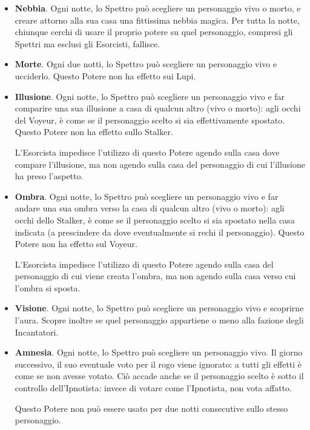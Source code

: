 \documentclass[a4paper,10pt]{article}
\begin{document}
\begin{itemize}
 \item {\bf Nebbia}. Ogni notte, lo Spettro può scegliere un personaggio vivo o morto, e creare attorno alla sua casa una fittissima nebbia magica. Per tutta la notte, chiunque cerchi di usare il proprio potere su quel personaggio, compresi gli Spettri ma esclusi gli Esorcisti, fallisce.
 
 \item {\bf Morte}. Ogni due notti, lo Spettro può scegliere un personaggio vivo e ucciderlo. Questo Potere non ha effetto sui Lupi.
 
 \item {\bf Illusione}. Ogni notte, lo Spettro può scegliere un personaggio vivo e far comparire una sua illusione a casa di qualcun altro (vivo o morto): agli occhi del Voyeur, è come se il personaggio scelto si sia effettivamente spostato.
 Questo Potere non ha effetto sullo Stalker.
 
 L'Esorcista impedisce l'utilizzo di questo Potere agendo sulla casa dove compare l'illusione, ma non agendo sulla casa del personaggio di cui l'illusione ha preso l'aspetto.

 \item {\bf Ombra}. Ogni notte, lo Spettro può scegliere un personaggio vivo e far andare una sua ombra verso la casa di qualcun altro (vivo o morto): agli occhi dello Stalker, è come se il personaggio scelto si sia spostato nella casa indicata (a prescindere da dove eventualmente si rechi il personaggio).
 Questo Potere non ha effetto sul Voyeur.
 
 L'Esorcista impedisce l'utilizzo di questo Potere agendo sulla casa del personaggio di cui viene creata l'ombra, ma non agendo sulla casa verso cui l'ombra si sposta.
 
 \item {\bf Visione}. Ogni notte, lo Spettro può scegliere un personaggio vivo e scoprirne l'aura. Scopre inoltre se quel personaggio appartiene o meno alla fazione degli Incantatori.
 
 \item {\bf Amnesia}. Ogni notte, lo Spettro può scegliere un personaggio vivo. Il giorno successivo, il suo eventuale voto per il rogo viene ignorato: a tutti gli effetti è come se non avesse votato. Ciò accade anche se il personaggio scelto è sotto il controllo dell'Ipnotista: invece di votare come l'Ipnotista, non vota affatto.
 
 Questo Potere non può essere usato per due notti consecutive sullo stesso personaggio.
 

\end{itemize}
\end{document}
